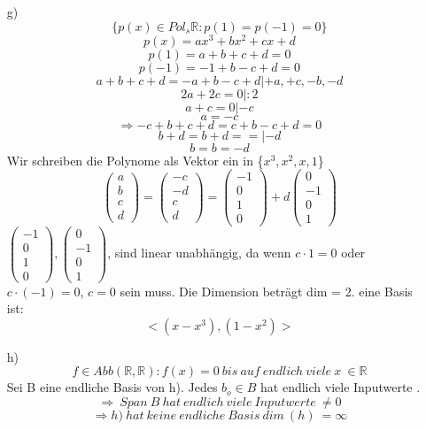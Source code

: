 \documentclass{article}
\begin{document}
\begin{enumerate}
        \item[g)]\[\{p(x)\in Pol_s \mathbb{R}: p(1)=p(-1)=0\}\]
        \[p(x)=ax^3+bx^2+cx+d\]
        \[p(1)=a+b+c+d=0\]
        \[p(-1)=-1+b-c+d=0\]
        \[a+b+c+d=-a+b-c+d |+a,+c,-b,-d\]
        \[2a+2c=0 |:2\]
        \[a+c=0 |-c\]
        \[a=-c\]
        \[\Rightarrow -c+b+c+d=c+b-c+d = 0\]
        \[b+d=b+d== |-d\]
        \[b=b=-d\]
        Wir schreiben die Polynome als Vektor ein in \{$x^3,x^2,x,1$\}
        \[
        \left(\begin{array}{c}a\\b\\c\\d\end{array}\right)=
        \left(\begin{array}{c}-c\\-d\\c\\d\end{array}\right)=
        \left(\begin{array}{c}-1\\0\\1\\0\end{array}\right)+d
        \left(\begin{array}{c}0\\-1\\0\\1\end{array}\right)
        \]
        $\left(\begin{array}{c}-1\\0\\1\\0\end{array}\right),\left(\begin{array}{c}0\\-1\\0\\1\end{array}\right)$, 
        sind linear unabhängig, da wenn $c\cdot 1=0$ oder \newline$c\cdot(-1)=0$, $c=0$ sein muss.
        Die Dimension beträgt dim = 2.
        eine Basis ist:
        \[<(x-x^3),(1-x^2)>\]

        \item[h)]\[f\in Abb(\mathbb{R},\mathbb{R}):f(x)=0\ bis\ auf\ endlich\ viele\ x\ \in \mathbb{R}\]
        Sei B eine endliche Basis von h). Jedes $b_o \in B$ hat endlich viele Inputwerte .
        \[\Rightarrow\ Span\ B\ hat\ endlich\ viele\ Inputwerte\ \neq 0\]
        \[\Rightarrow h)\ hat\ keine\ endliche\ Basis\ dim\ (h)\ = \infty\]        
    \end{enumerate}
\end{document}
